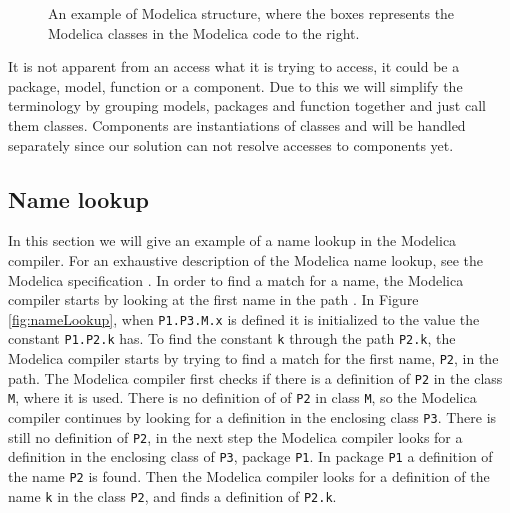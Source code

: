\documentclass{cslthse-msc}
\begin{document}
\begin{figure}[!htbp]
    \centering
    \qquad
    \subfloat{\raisebox{3.2 cm}{}}
    \caption{An example of Modelica structure, where the boxes represents the Modelica classes in the Modelica code to the right.}
    \label{fig:modelicaExample}
\end{figure}

It is not apparent from an access what it is trying to access, it could be a package, model, function or a component. Due to this we will simplify the terminology by grouping models, packages and function together and just call them classes. Components are instantiations of classes and will be handled separately since our solution can not resolve accesses to components yet.

\subsection{Name lookup}
In this section we will give an example of a name lookup in the Modelica compiler. For an exhaustive description of the Modelica name lookup, see the Modelica specification \cite{modelicamodelica}. In order to find a match for a name, the Modelica compiler starts by looking at the first name in the path \cite{modelicamodelica, tillermodelica}. In Figure \ref{fig:nameLookup}, when \texttt{P1.P3.M.x} is defined it is initialized to the value the constant \texttt{P1.P2.k} has. To find the constant \texttt{k} through the path \texttt{P2.k}, the Modelica compiler starts by trying to find a match for the first name, \texttt{P2}, in the path. The Modelica compiler first checks if there is a definition of \texttt{P2} in the class \texttt{M}, where it is used. There is no definition of of \texttt{P2} in class \texttt{M}, so the Modelica compiler continues by looking for a definition in the enclosing class \texttt{P3}. There is still no definition of \texttt{P2}, in the next step the Modelica compiler looks for a definition in the enclosing class of \texttt{P3}, package \texttt{P1}. In package \texttt{P1} a definition of the name \texttt{P2} is found. Then the Modelica compiler looks for a definition of the name \texttt{k} in the class \texttt{P2}, and finds a definition of \texttt{P2.k}.
\end{document}
